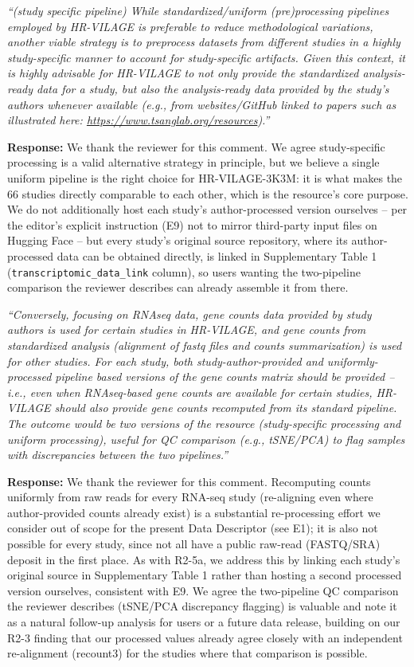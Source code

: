 \documentclass[11pt]{article}
\newcommand{\origcomment}[1]{\textit{``#1''}}
\newcommand{\filledresponse}[1]{%
  \par\medskip\noindent\textbf{Response:} #1\par
  \vspace{0.4cm}%
  \par\noindent\hrulefill\par\bigskip
}
\begin{document}
\begin{commentlist}
\item[R2-5a.] \origcomment{(study specific pipeline) While standardized/uniform (pre)processing
pipelines employed by HR-VILAGE is preferable to reduce methodological variations, another viable
strategy is to preprocess datasets from different studies in a highly study-specific manner to
account for study-specific artifacts. Given this context, it is highly advisable for HR-VILAGE to
not only provide the standardized analysis-ready data for a study, but also the analysis-ready
data provided by the study's authors whenever available (e.g., from websites/GitHub linked to
papers such as illustrated here: \url{https://www.tsanglab.org/resources}).}
\filledresponse{We thank the reviewer for this comment. We agree study-specific processing is a
valid alternative strategy in principle, but we believe a single uniform pipeline is the right
choice for HR-VILAGE-3K3M: it is what makes the 66 studies directly comparable to each other, which
is the resource's core purpose. We do not additionally host each study's author-processed version
ourselves -- per the editor's explicit instruction (E9) not to mirror third-party input files on
Hugging Face -- but every study's original source repository, where its author-processed data can
be obtained directly, is linked in Supplementary Table 1 (\texttt{transcriptomic\_data\_link}
column), so users wanting the two-pipeline comparison the reviewer describes can already assemble
it from there.}

\item[R2-5b.] \origcomment{Conversely, focusing on RNAseq data, gene counts data provided by study
authors is used for certain studies in HR-VILAGE, and gene counts from standardized analysis
(alignment of fastq files and counts summarization) is used for other studies. For each study,
both study-author-provided and uniformly-processed pipeline based versions of the gene counts
matrix should be provided -- i.e., even when RNAseq-based gene counts are available for certain
studies, HR-VILAGE should also provide gene counts recomputed from its standard pipeline. The
outcome would be two versions of the resource (study-specific processing and uniform processing),
useful for QC comparison (e.g., tSNE/PCA) to flag samples with discrepancies between the two
pipelines.}
\filledresponse{We thank the reviewer for this comment. Recomputing counts uniformly from raw reads
for every RNA-seq study (re-aligning even where author-provided counts already exist) is a
substantial re-processing effort we consider out of scope for the present Data Descriptor (see E1);
it is also not possible for every study, since not all have a public raw-read (FASTQ/SRA) deposit
in the first place. As with R2-5a, we address this by linking each study's original source in
Supplementary Table 1 rather than hosting a second processed version ourselves, consistent with
E9. We agree the two-pipeline QC comparison the reviewer describes (tSNE/PCA discrepancy flagging)
is valuable and note it as a natural follow-up analysis for users or a future data release, building
on our R2-3 finding that our processed values already agree closely with an independent
re-alignment (recount3) for the studies where that comparison is possible.}


\end{commentlist}
\end{document}
